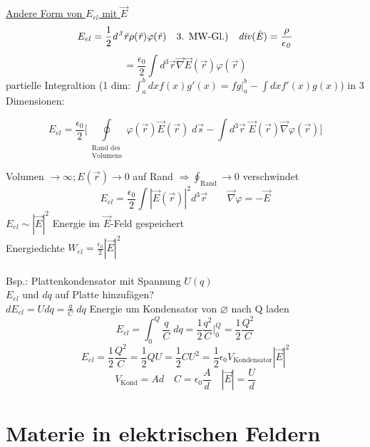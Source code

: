 \documentclass[titlepage,12pt,a4paper,ngerman]{report}
\newcommand{\tx}[1]{\textrm{#1}}
\begin{document}
\underline{Andere Form von $E_{el}$ mit $ \vec{E}$}
$$E_{el} = \frac{1}{2} \it d^3\vec{r} \rho(\vec{r}) \varphi(\vec{r}) \quad \tx{3. MW-Gl.)} \quad div(\vec{E}) = \frac{\rho}{\epsilon_0}$$
$$= \frac{\epsilon_0}{2} \int d^3 \vec{r} \vec{\nabla} \vec{E}(\vec{r}) \varphi(\vec{r})$$
partielle Integraltion (1 dim: $\int_a^b dx f(x) g'(x) = fg \bigg \vert _a^b - \int dx f'(x) g(x)$)
in 3 Dimensionen:

$$ E_{el}= \frac{\epsilon_0}{2} \bigg[ \oint \limits _{\substack{\tx{Rand des} \\ \tx{Volumens}}} \varphi(\vec{r}) \vec{E}(\vec{r}) \; d\vec{s} - \int d^3\vec{r}\; \vec{E}(\vec{r}) \vec{\nabla} \varphi(\vec{r}) \bigg]$$

Volumen $\rightarrow \infty ; E(\vec{r}) \rightarrow 0$ auf Rand $ \Rightarrow \oint_{\tx{Rand}} \rightarrow 0 $ verschwindet
$$E_{el} = \frac{\epsilon_0}{2} \int |\vec{E}(\vec{r})|^2 d^3 \vec{r}\qquad \vec{\nabla} \varphi = - \vec{E}$$
$E_{el} \sim |\vec{E}|^2$ Energie im $\vec{E}$-Feld gespeichert\\
Energiedichte $W_{el} = \frac{\epsilon_0}{2} | \vec{E}| ^2$\\\\
Bsp.: Plattenkondensator mit Spannung $U(q)$\\
$E_{el}$ und $dq$ auf Platte hinzufägen? \\
$dE_{el} = U dq = \frac{q}{C} \; dq$
Energie um Kondensator von $\varnothing$ nach Q laden
$$E_{el} = \int ^Q _0 \frac{q}{C} \; dq = \frac{1}{2} \frac{q^2}{C} |_0^Q = \frac{1}{2} \frac{Q^2}{C}$$
$$E_{el} = \frac{1}{2} \frac{Q^2}{C} = \frac{1}{2} Q U = \frac{1}{2} C U^2 = \frac{1}{2} \epsilon_0 V_{\tx{Kondensator}} |\vec{E}|^2$$
$$V_{\tx{Kond}} = Ad \quad C= \epsilon_0 \frac{A}{d} \quad |\vec{E}| = \frac{U}{d}$$

\section{Materie in elektrischen Feldern}
\end{document}
